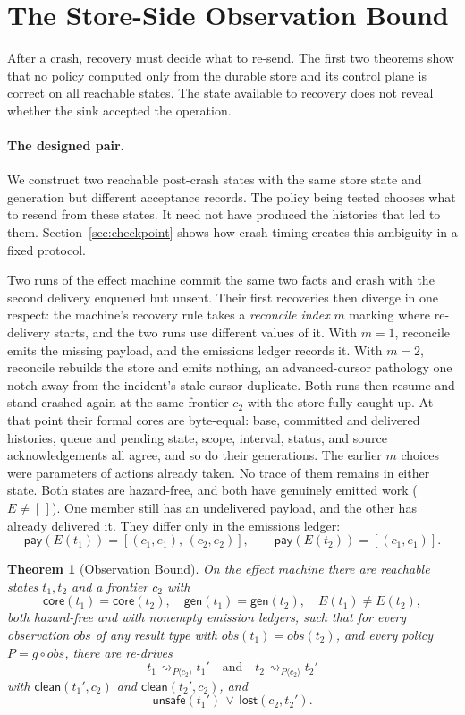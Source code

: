 \documentclass[sigplan,10pt]{acmart}
\theoremstyle{plain}
\newtheorem{theorem}{Theorem}
\theoremstyle{definition}
\newcommand{\corein}{\mathsf{core}}        %
\newcommand{\gen}{\mathsf{gen}}            %
\newcommand{\pay}{\mathsf{pay}}            %
\newcommand{\unsafe}{\mathsf{unsafe}}
\newcommand{\lostp}{\mathsf{lost}}
\newcommand{\clean}{\mathsf{clean}}        %
\newcommand{\rdrto}[2]{\mathrel{\rightsquigarrow_{#1\langle #2\rangle}}} %
\begin{document}
\section{The Store-Side Observation Bound}\label{sec:wall}

After a crash, recovery must decide what to re-send. The first two
theorems show that no policy computed only from the durable store and
its control plane is correct on all reachable states. The state
available to recovery does not reveal whether the sink accepted the
operation.

\paragraph{The designed pair.}
We construct two reachable post-crash states with the same store
state and generation but different acceptance records. The policy
being tested chooses what to resend from these states. It need not
have produced the histories that led to them.
Section~\ref{sec:checkpoint} shows how crash timing creates this
ambiguity in a fixed protocol.

Two runs of the effect machine commit the same two facts and crash with
the second delivery enqueued but unsent. Their first recoveries then
diverge in one respect: the machine's recovery rule takes a
\emph{reconcile index} $m$ marking where re-delivery starts, and the
two runs use different values of it. With $m=1$, reconcile emits the
missing payload, and the emissions ledger records it. With $m=2$, reconcile
rebuilds the store and emits nothing, an advanced-cursor pathology one
notch away from the incident's stale-cursor duplicate. Both runs then
resume and stand crashed again at the same frontier $c_2$ with the
store fully caught up. At that point their formal cores are byte-equal:
base, committed and delivered histories, queue and pending state,
scope, interval, status, and source acknowledgements all agree, and so
do their generations. The earlier $m$ choices were parameters of
actions already taken. No trace of them remains in either state. Both
states are hazard-free, and both have genuinely emitted work
($E\neq[\,]$). One member still has an undelivered payload, and the other has
already delivered it. They differ only in the emissions ledger:
\[
  \pay(E(t_1)) = [(c_1,e_1),\,(c_2,e_2)],
  \qquad
  \pay(E(t_2)) = [(c_1,e_1)].
\]

\begin{theorem}[Observation Bound]\label{thm:obsbound}
On the effect machine there are reachable states $t_1, t_2$ and a
frontier $c_2$ with
\[
  \corein(t_1) = \corein(t_2), \quad
  \gen(t_1) = \gen(t_2), \quad
  E(t_1) \neq E(t_2),
\]
both hazard-free and with nonempty emission ledgers, such that for every
observation $\mathit{obs}$ of any result type with
$\mathit{obs}(t_1) = \mathit{obs}(t_2)$, and every policy
$P = g \circ \mathit{obs}$, there are re-drives
\[
  t_1 \rdrto{P}{c_2} t_1' \quad\text{and}\quad t_2 \rdrto{P}{c_2} t_2'
\]
with $\clean(t_1',c_2)$ and $\clean(t_2',c_2)$, and
\[
  \unsafe(t_1') \,\vee\, \lostp(c_2, t_2').
\]
\end{theorem}
\end{document}
